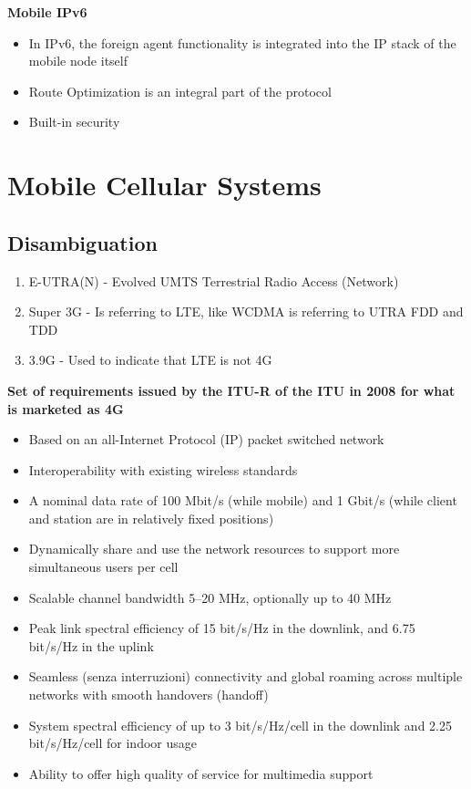 \textbf{Mobile IPv6}

\begin{itemize}
\item In IPv6, the foreign agent functionality is integrated into the IP stack
of the mobile node itself
\item Route Optimization is an integral part of the protocol
\item Built-in security
\end{itemize}

\section{Mobile Cellular Systems}

\subsection{Disambiguation}

\begin{enumerate}
\item E-UTRA(N) - Evolved UMTS Terrestrial Radio Access (Network)
\item Super 3G - Is referring to LTE, like WCDMA is referring to UTRA FDD and
TDD
\item 3.9G - Used to indicate that LTE is not 4G
\end{enumerate}

\textbf{Set of requirements issued by the ITU-R of the ITU in 2008 for what is
marketed as 4G}

\begin{itemize}
\item Based on an all-Internet Protocol (IP) packet switched network
\item Interoperability with existing wireless standards
\item A nominal data rate of 100 Mbit/s (while mobile) and 1 Gbit/s (while
client and station are in relatively fixed positions)
\item Dynamically share and use the network resources to support more
simultaneous users per cell
\item Scalable channel bandwidth 5–20 MHz, optionally up to 40 MHz
\item Peak link spectral efficiency of 15 bit/s/Hz in the downlink, and 6.75
bit/s/Hz in the uplink
\item Seamless (senza interruzioni) connectivity and global roaming across
multiple networks with smooth handovers (handoff)
\item System spectral efficiency of up to 3 bit/s/Hz/cell in the downlink and
2.25 bit/s/Hz/cell for indoor usage
\item Ability to offer high quality of service for multimedia support
\end{itemize}


